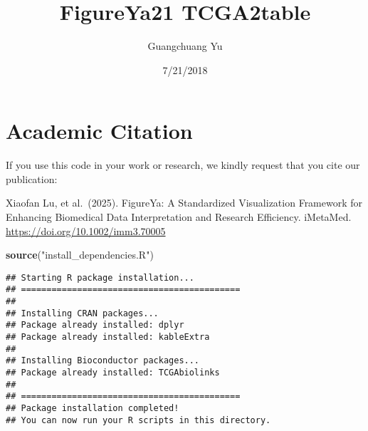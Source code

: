 \documentclass[
]{article}
\title{FigureYa21 TCGA2table}
\author{Guangchuang Yu}
\date{7/21/2018}
\newenvironment{Shaded}{\begin{snugshade}}{\end{snugshade}}
\newcommand{\FunctionTok}[1]{\textcolor[rgb]{0.13,0.29,0.53}{\textbf{#1}}}
\newcommand{\NormalTok}[1]{#1}
\newcommand{\StringTok}[1]{\textcolor[rgb]{0.31,0.60,0.02}{#1}}
\begin{document}
\maketitle

\section{Academic Citation}\label{academic-citation}

If you use this code in your work or research, we kindly request that
you cite our publication:

Xiaofan Lu, et al.~(2025). FigureYa: A Standardized Visualization
Framework for Enhancing Biomedical Data Interpretation and Research
Efficiency. iMetaMed. \url{https://doi.org/10.1002/imm3.70005}

\begin{Shaded}
\begin{Highlighting}[]
\FunctionTok{source}\NormalTok{(}\StringTok{"install\_dependencies.R"}\NormalTok{)}
\end{Highlighting}
\end{Shaded}

\begin{verbatim}
## Starting R package installation...
## ===========================================
## 
## Installing CRAN packages...
## Package already installed: dplyr 
## Package already installed: kableExtra 
## 
## Installing Bioconductor packages...
## Package already installed: TCGAbiolinks 
## 
## ===========================================
## Package installation completed!
## You can now run your R scripts in this directory.
\end{verbatim}
\end{document}

